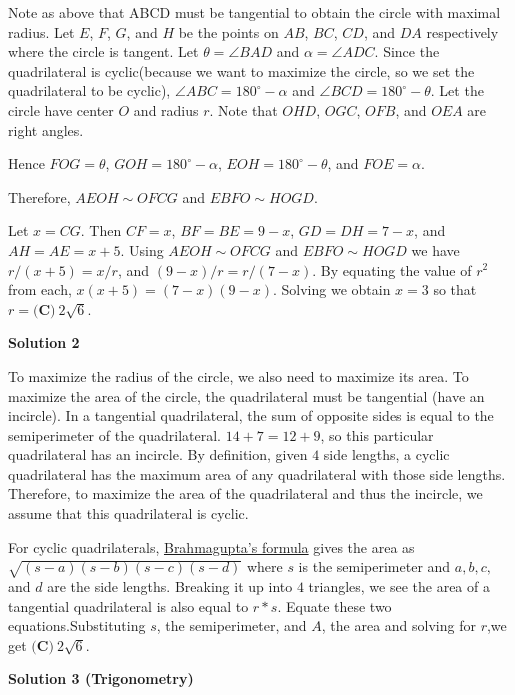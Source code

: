 \begin{enumerate}
Note as above that ABCD must be tangential to obtain the circle with maximal radius. Let $E$, $F$, $G$, and $H$ be the points on $AB$, $BC$, $CD$, and $DA$ respectively where the circle is tangent. Let $\theta=\angle BAD$ and $\alpha=\angle ADC$. Since the quadrilateral is cyclic(because we want to maximize the circle, so we set the quadrilateral to be cyclic), $\angle ABC=180^{\circ}-\alpha$ and $\angle BCD=180^{\circ}-\theta$. Let the circle have center $O$ and radius $r$. Note that $OHD$, $OGC$, $OFB$, and $OEA$ are right angles. 

 Hence $FOG=\theta$, $GOH=180^{\circ}-\alpha$, $EOH=180^{\circ}-\theta$, and $FOE=\alpha$. 

 Therefore, $AEOH\sim OFCG$ and $EBFO\sim HOGD$. 

 Let $x=CG$. Then $CF=x$, $BF=BE=9-x$, $GD=DH=7-x$, and $AH=AE=x+5$. Using $AEOH\sim OFCG$ and $EBFO\sim HOGD$ we have $r/(x+5)=x/r$, and $(9-x)/r=r/(7-x)$. By equating the value of $r^2$ from each, $x(x+5)=(7-x)(9-x)$. Solving we obtain $x=3$ so that $r=\boxed{\textbf{(C)}\ 2\sqrt{6}}$.

 



\textbf{Solution 2}

To maximize the radius of the circle, we also need to maximize its area. To maximize the area of the circle, the quadrilateral must be tangential (have an incircle). In a tangential quadrilateral, the sum of opposite sides is equal to the semiperimeter of the quadrilateral. $14+7=12+9$, so this particular quadrilateral has an incircle. By definition, given $4$ side lengths, a cyclic quadrilateral has the maximum area of any quadrilateral with those side lengths. Therefore, to maximize the area of the quadrilateral and thus the incircle, we assume that this quadrilateral is cyclic. 

 For cyclic quadrilaterals, \href{https://artofproblemsolving.com/wiki/index.php?title=Brahmagupta\%27s\_formula}{Brahmagupta's formula} gives the area as $\sqrt{(s-a)(s-b)(s-c)(s-d)}$ where $s$ is the semiperimeter and $a, b, c,$ and $d$ are the side lengths. Breaking it up into $4$ triangles, we see the area of a tangential quadrilateral is also equal to $r*s$. Equate these two equations.Substituting $s$, the semiperimeter, and $A$, the area and solving for $r$,we get $\boxed{\textbf{(C)}\ 2\sqrt{6}}$.

 



\textbf{Solution 3 (Trigonometry)}


\end{enumerate}
